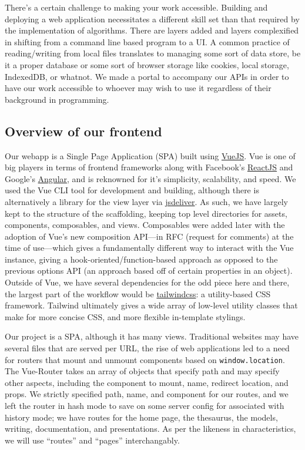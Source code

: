 \documentclass[11pt, twoside, reqno]{book}
\begin{document}
There's a certain challenge to making your work accessible. Building and deploying a web application necessitates a different skill set than that required by the implementation of algorithms. There are layers added and layers complexified in shifting from a command line based program to a UI. A common practice of reading/writing from local files translates to managing some sort of data store, be it a proper database or some sort of browser storage like cookies, local storage, IndexedDB, or whatnot. We made a portal to accompany our APIs in order to have our work accessible to whoever may wish to use it regardless of their background in programming.

\subsection{Overview of our frontend}

Our webapp is a Single Page Application (SPA) built using \href{https://vuejs.org/}{VueJS}. Vue is one of big players in terms of frontend frameworks along with Facebook's \href{https://reactjs.org/}{ReactJS} and Google's \href{https://angular.io/}{Angular}, and is reknowned for it's simplicity, scalability, and speed. We used the Vue CLI tool for development and building, although there is alternatively a library for the view layer via \href{https://cdn.jsdelivr.net/npm/vue/dist/vue.js}{jsdeliver}. As such, we have largely kept to the structure of the scaffolding, keeping top level directories for assets, components, composables, and views. Composables were added later with the adoption of Vue's new composition API—in RFC (request for comments) at the time of use—which gives a fundamentally different way to interact with the Vue instance, giving a hook-oriented/function-based approach as opposed to the previous options API (an approach based off of certain properties in an object). Outside of Vue, we have several dependencies for the odd piece here and there, the largest part of the workflow would be \href{https://tailwindcss.com/}{tailwindcss}: a utility-based CSS framework. Tailwind ultimately gives a wide array of low-level utility classes that make for more concise CSS, and more flexible in-template stylings.

Our project is a SPA, although it has many views. Traditional websites may have several files that are served per URL, the rise of web applications led to a need for routers that mount and unmount components based on \texttt{window.location}. The Vue-Router takes an array of objects that specify path and may specify other aspects, including the component to mount, name, redirect location, and props. We strictly specified path, name, and component for our routes, and we left the router in hash mode to save on some server config for associated with history mode; we have routes for the home page, the thesaurus, the models, writing, documentation, and presentations. As per the likeness in characteristics, we will use ``routes'' and ``pages'' interchangably.
\end{document}
